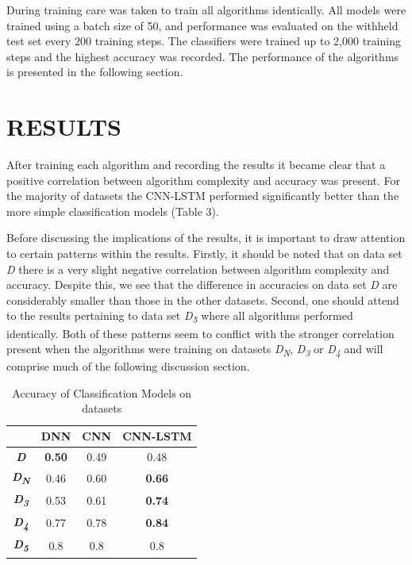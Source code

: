 \documentclass[letterpaper, 10 pt, conference]{ieeeconf}  %
\begin{document}
    During training care was taken to train all algorithms identically. All models were trained using a batch size of 50, and performance was evaluated on the withheld test set every 200 training steps. The classifiers were trained up to 2,000 training steps and the highest accuracy was recorded. The performance of the algorithms is presented in the following section. 

\section{RESULTS}
	After training each algorithm and recording the results it became clear that a positive correlation between algorithm complexity and accuracy was present. For the majority of datasets the CNN-LSTM performed significantly better than the more simple classification models (Table 3).
	
    Before discussing the implications of the results, it is important to draw attention to certain patterns within the results. Firstly, it should be noted that on data set \textit{D} there is a very slight negative correlation between algorithm complexity and accuracy. Despite this, we see that the difference in accuracies on data set \textit{D} are considerably smaller than those in the other datasets. Second, one should attend to the results pertaining to data set \textit{D\textsubscript{5}} where all algorithms performed identically. Both of these patterns seem to conflict with the stronger correlation present when the algorithms were training on datasets \textit{D\textsubscript{N}}, \textit{D\textsubscript{3}} or \textit{D\textsubscript{4}} and will comprise much of the following discussion section. 

\begin{table}
\caption{Accuracy of Classification Models on datasets}
\setlength{\tabcolsep}{5mm} %
\def\arraystretch{1.25} %
\centering

  \begin{tabular}{|c|c|c|c|}
	\hline
    & \textbf{DNN} & \textbf{CNN} & \textbf{CNN-LSTM} \\ \hline
    \textbf{\textit{D}} & \textbf{0.50} & 0.49 & 0.48 \\ \hline
    \textbf{\textit{D\textsubscript{N}}} & 0.46 & 0.60 & \textbf{0.66} \\ \hline
    \textbf{\textit{D\textsubscript{3}}} & 0.53 & 0.61 & \textbf{0.74} \\ \hline
    \textbf{\textit{D\textsubscript{4}}} & 0.77 & 0.78 & \textbf{0.84}\\ \hline
    \textbf{\textit{D\textsubscript{5}}} & 0.8 & 0.8 & 0.8 \\ \hline
  \end{tabular}
\end{table}
\end{document}
